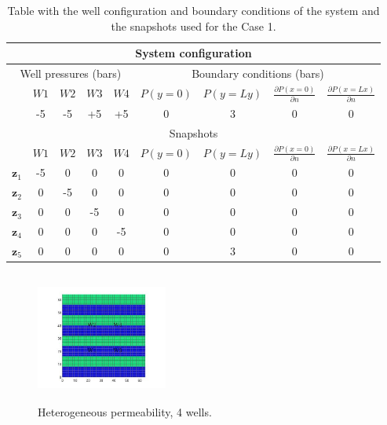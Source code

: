 \documentclass[12pt]{article}
\begin{document}
\begin{table}[!ht]\centering
\begin{minipage}{.8\textwidth}
\vspace{-10pt}
\centering
\begin{tabular}{ |c|c|c|c|c|c|c|c|c|} 
 \hline
  \multicolumn{9}{|c|}{System configuration} \\ 
  \hline
  \multicolumn{5}{|c|}{Well pressures (bars)}&\multicolumn{4}{c|}{Boundary conditions (bars)}\\
  \hline
  &$W1$ &$W2$ &$W3$ &$W4$ &$P(y=0)$ & $P(y=Ly)$&$\frac{\partial P(x=0)}{\partial n}$ & $\frac{\partial P(x=Lx)}{\partial n}$\\
  \hline
& -5& -5& +5& +5& 0& 3&0 &0 \\
\hline
\multicolumn{9}{|c|}{Snapshots} \\
\hline
  &$W1$ &$W2$ &$W3$ &$W4$ &$P(y=0)$ & $P(y=Ly)$&$\frac{\partial P(x=0)}{\partial n}$ & $\frac{\partial P(x=Lx)}{\partial n}$\\
  \hline
$\mathbf{z}_1$& -5&0 &0 &0 &0 &0 &0 &0 \\
$\mathbf{z}_2$& 0& -5& 0& 0& 0& 0& 0& 0\\
$\mathbf{z}_3$& 0& 0& -5& 0& 0& 0& 0& 0\\
$\mathbf{z}_4$& 0& 0& 0& -5&0 & 0& 0&0 \\
$\mathbf{z}_5$& 0& 0& 0& 0& 0& 3& 0&0 \\
 \hline
\end{tabular}
\caption{Table with the well configuration and boundary conditions of the system and the snapshots used for the Case 1.}
\label{table:c1}
\end{minipage}
\end{table}

\begin{figure}
\centering 
\vspace{-10pt}
\includegraphics[width=4.3cm,height=4.3cm,keepaspectratio]{images_prev/perm_he_1.jpg}
 \vspace{-20pt}
\caption{ Heterogeneous permeability, 4 wells.}\label{fig:hep}
\vspace{-15pt}
\end{figure}
\end{document}

